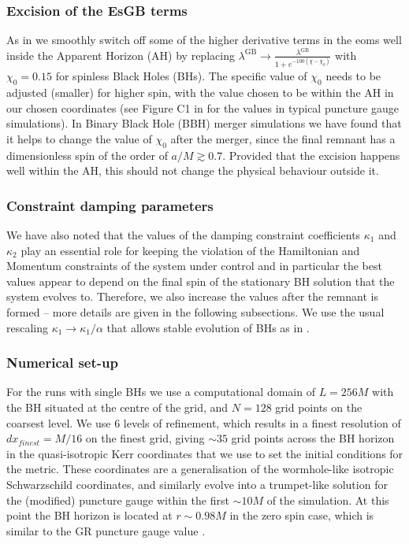 \documentclass[reprint,aps,amsmath,amssymb,twoside,prd,showkeys,superscriptaddress,nofootinbib]{revtex4-2}
\begin{document}
\subsubsection{Excision of the EsGB terms}

As in \cite{short_paper,Figueras:2020dzx,Figueras:2021abd} we smoothly switch off some of the higher derivative terms in the eoms well inside the Apparent Horizon (AH) by replacing $\lambda^{\text{GB}}\to\tfrac{\lambda^{\text{GB}}}{1+e^{-100(\chi-\chi_0)}}$ with $\chi_0=0.15$ for spinless Black Holes (BHs). The specific value of $\chi_0$ needs to be adjusted (smaller) for higher spin, with the value chosen to be within the AH in our chosen coordinates (see Figure C1 in \cite{Radia:2021smk} for the values in typical puncture gauge simulations). In Binary Black Hole (BBH) merger simulations we have found that it helps to change the value of $\chi_0$ after the merger, since the final remnant has a dimensionless spin of the order of $a/M\gtrsim 0.7$. Provided that the excision happens well within the AH, this should not change the physical behaviour outside it.

\subsubsection{Constraint damping parameters}

We have also noted that the values of the damping constraint coefficients $\kappa_1$ and $\kappa_2$ play an essential role for keeping the violation of the Hamiltonian and Momentum constraints of the system under control and in particular the best values appear to depend on the final spin of the stationary BH solution that the system evolves to. Therefore, we also increase the values after the remnant is formed -- more details are given in the following subsections. We use the usual rescaling $\kappa_1\to\kappa_1/\alpha$ that allows stable evolution of BHs as in \cite{Alic:2013xsa}.

\subsubsection{Numerical set-up}

For the runs with single BHs we use a computational domain of $L = 256M$ with the BH situated at the centre of the grid, and $N=128$ grid points on the coarsest level. We use $6$ levels of refinement, which results in a finest resolution of $dx_{finest} = M/16$ on the finest grid, giving $\sim 35$ grid points across the BH horizon in the quasi-isotropic Kerr coordinates \cite{Liu:2009al} that we use to set the initial conditions for the metric.  These coordinates are a generalisation of the wormhole-like isotropic Schwarzschild coordinates, and similarly evolve into a trumpet-like solution for the (modified) puncture gauge within the first $\sim 10M$ of the simulation. At this point the BH horizon is located at $r\sim 0.98M$ in the zero spin case, which is similar to the GR puncture gauge value \cite{Radia:2021smk}.
\end{document}
